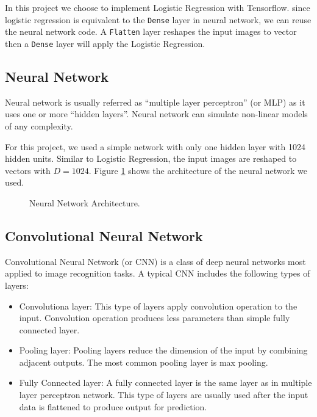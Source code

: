 \documentclass[journal]{IEEEtran}
\begin{document}
In this project we choose to implement Logistic Regression with Tensorflow. since logistic regression is equivalent to the \texttt{Dense} layer in neural network, we can reuse the neural network code. A \texttt{Flatten} layer reshapes the input images to vector then a \texttt{Dense} layer will apply the Logistic Regression.

\subsection{Neural Network}

Neural network is usually referred as ``multiple layer perceptron'' (or MLP) as it uses one or more ``hidden layers''. Neural network can simulate non-linear models of any complexity.

For this project, we used a simple network with only one hidden layer with 1024 hidden units.
Similar to Logistic Regression, the input images are reshaped to vectors with $D=1024$. 
Figure \ref{fig:nn_arch} shows the architecture of the neural network we used.

\begin{figure}[tb]
    \centering
    
    \caption{Neural Network Architecture.}
    \label{fig:nn_arch}
\end{figure}

\subsection{Convolutional Neural Network}

Convolutional Neural Network (or CNN) is a class of deep neural networks most applied to image recognition tasks. A typical CNN includes the following types of layers:

\begin{itemize}
    \item Convolutiona layer: This type of layers apply convolution operation to the input. Convolution operation produces less parameters than simple fully connected layer.
    \item Pooling layer: Pooling layers reduce the dimension of the input by combining adjacent outputs. The most common pooling layer is max pooling.
    \item Fully Connected layer: A fully connected layer is the same layer as in multiple layer perceptron network. This type of layers are usually used after the input data is flattened to produce output for prediction.
\end{itemize}
\end{document}
